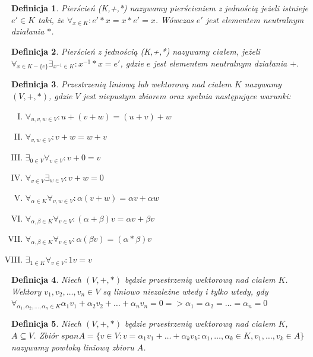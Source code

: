 \documentclass[12pt,a4paper]{article}
\newtheorem{df}{Definicja}[section]
\begin{document}
\begin{df} 
Pier\'scie\'n (K,+,*) nazywamy pier\'scieniem z jedno\'sci\k{a} je\.zeli istnieje $e'\in K$ taki, \.ze $\forall_{x\in K}: e'*x=x*e'=x$. W\'owczas $e'$ jest elementem neutralnym dzia{\l}ania $*$.
\end{df}
\begin{df} 
Pier\'scie\'n z jedno\'sci\k{a} (K,+,*) nazywamy cia{\l}em, je\.zeli $\forall_{x\in K-\{e\}} \exists_{x^{-1}\in K}: x^{-1}*x=e'$, gdzie $e$ jest elementem neutralnym działania $+$.
\end{df}
\begin{df}
Przestrzeni\k{a} liniow\k{a} lub wektorow\k{a} nad cia{\l}em $K$ nazywamy $(V, +, *)$, gdzie $V$ jest niepustym zbiorem oraz spe{\l}nia nast\k{e}puj\k{a}ce warunki:
\begin{enumerate}[I.]
\item $\forall_{u, v, w \in V}: u + (v + w) = (u + v) + w$
\item $\forall_{v, w \in V}: v + w = w + v$
\item $\exists_{0 \in V} \forall_{v \in V}: v + 0 = v$
\item $\forall_{v \in V} \exists_{w \in V}: v + w = 0$
\item $\forall_{\alpha \in K} \forall_{v, w \in V}: \alpha(v + w) = \alpha v + \alpha w$
\item $\forall_{\alpha, \beta \in K} \forall_{v \in V}: (\alpha + \beta)v = \alpha v + \beta v$
\item $\forall_{\alpha, \beta \in K} \forall_{v \in V}: \alpha(\beta v) = (\alpha*\beta)v$
\item $\exists_{1 \in K} \forall_{v \in V}: 1v = v$
\end{enumerate}
\end{df}
\begin{df}
Niech $(V,+,*)$ b\k{e}dzie przestrzeni\k{a} wektorow\k{a} nad cia{\l}em $K$. Wektory $v_{1}, v_{2}, \dots, v_{n}\in V$ s\k{a} liniowo niezale\.{z}ne wtedy i tylko wtedy, gdy $\forall_{\alpha_{1}, \alpha_{2}, \dots, \alpha_{n} \in K} \alpha_{1}v_{1} + \alpha_{2}v_{2} + \dots + \alpha_{n}v_{n} = 0 => \alpha_{1} = \alpha_{2} = \dots = \alpha_{n} = 0$
\end{df}
\begin{df}
Niech $(V, +, *)$ b\k{e}dzie przestrzeni\k{a} wektorow\k{a} nad cia{\l}em $K$, $A\subseteq V$. Zbi\'or $spanA=\{v\in V: v=\alpha_{1}v_{1}+\ldots+\alpha_{k}v_{k}: \alpha_{1},\ldots,\alpha_{k}\in K, v_{1},\ldots,v_{k}\in A\}$ nazywamy pow{\l}ok\k{a} liniow\k{a} zbioru $A$.
\end{df}
\end{document}
